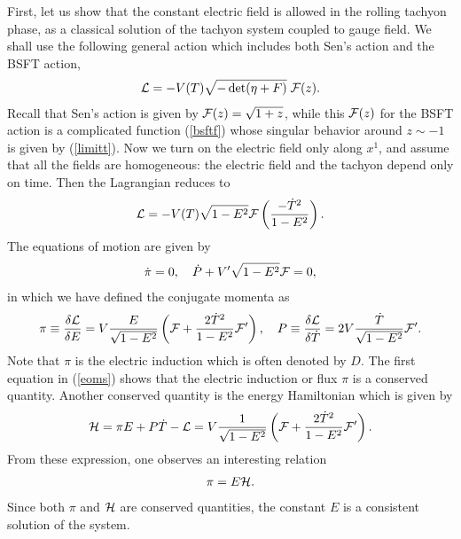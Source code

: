 \documentclass[a4paper,12pt]{article}
\begin{document}
First, let us show that the constant electric field is 
allowed in the rolling tachyon phase, 
as a classical solution of the tachyon system coupled to gauge field. 
We shall use the following general action which includes both 
Sen's action and the BSFT action, 
\begin{eqnarray}
  {\cal L} = -V(T) \sqrt{-\det (\eta + F)} \;
{\cal F}(z).
\label{geneact}
\end{eqnarray}
Recall that Sen's action is given by ${\cal F} (z) = \sqrt{1+z}$,
while this ${\cal F}(z)$ for the BSFT action is a complicated function 
(\ref{bsftf}) whose singular behavior around $z\sim -1$ is given by
(\ref{limitt}).
Now we turn on the electric field only along $x^1$, and assume that
all the fields are homogeneous: the electric field and the tachyon 
depend only on time. Then the Lagrangian reduces
to
\begin{eqnarray}
  {\cal L} = -V(T) \sqrt{1-E^2} {\cal F}
\left( \frac{-\dot{T}^2}{1-E^2}\right).
\end{eqnarray}
The equations of motion are given by
\begin{eqnarray}
 \dot{\pi} =0, \quad
\dot{P} + V' \sqrt{1-E^2} {\cal F} =0,
\label{eoms}
\end{eqnarray}
in which we have defined the conjugate momenta as
\begin{eqnarray}
  \pi \equiv \frac{\delta{\cal L}}{\delta E}
=V \frac{E}{\sqrt{1-E^2}} 
\left({\cal F} + \frac{2\dot{T}^2}{1-E^2} {\cal F}'
\right),
\quad 
P \equiv 
\frac{\delta{\cal L}}{\delta \dot{T}}=
2 V \frac{\dot{T}}{\sqrt{1-E^2}} {\cal F}'.
\label{P}
\end{eqnarray}
Note that $\pi$ is the electric induction which is often  denoted by
$ D$. The first equation in (\ref{eoms}) shows 
that the electric induction or flux $\pi$ is a conserved quantity.
Another conserved quantity is the energy Hamiltonian which 
is given by
\begin{eqnarray}
  {\cal H} = \pi E + P \dot{T} - {\cal L}
= V \frac{1}{\sqrt{1-E^2}} 
\left({\cal F}+ \frac{2\dot{T}^2}{1-E^2}
{\cal F}'\right).
\label{H}
\end{eqnarray}
{}From these expression, one observes an interesting relation
\begin{eqnarray}
  \pi = E {\cal H}. 
\label{rela}
\end{eqnarray}
Since both 
$\pi$ and ${\cal H}$ are conserved quantities, the constant $E$ is
a consistent solution of the system.
\end{document}
